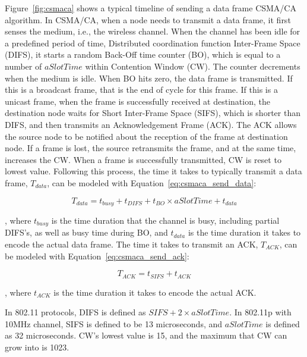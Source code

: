 \documentclass[12pt]{report}
\begin{document}
Figure~\ref{fig:csmaca} shows a typical timeline of sending a data frame CSMA/CA algorithm. In CSMA/CA, when a node needs to transmit a data frame, it first senses the medium, i.e., the wireless channel. When the channel has been idle for a predefined period of time, Distributed coordination function Inter-Frame Space (DIFS), it starts a random Back-Off time counter (BO), which is equal to a number of $aSlotTime$ within Contention Window (CW). The counter decrements when the medium is idle. When BO hits zero, the data frame is transmitted. If this is a broadcast frame, that is the end of cycle for this frame. If this is a unicast frame, when the frame is successfully received at destination, the destination node waits for Short Inter-Frame Space (SIFS), which is shorter than DIFS, and then transmits an Acknowledgement Frame (ACK). The ACK allows the source node to be notified about the reception of the frame at destination node. If a frame is lost, the source retransmits the frame, and at the same time, increases the CW. When a frame is successfully transmitted, CW is reset to lowest value. Following this process, the time it takes to typically transmit a data frame, $T_{data}$, can be modeled with Equation~\ref{eq:csmaca_send_data}:

\begin{equation}
  T_{data}=t_{busy}+t_{DIFS}+t_{BO}\times aSlotTime+t_{data}
  \label{eq:csmaca_send_data}
\end{equation}

, where $t_{busy}$ is the time duration that the channel is busy, including partial DIFS's, as well as busy time during BO, and $t_{data}$ is the time duration it takes to encode the actual data frame. The time it takes to transmit an ACK, $T_{ACK}$, can be modeled with Equation~\ref{eq:csmaca_send_ack}:

\begin{equation}
  T_{ACK}=t_{SIFS}+t_{ACK}
  \label{eq:csmaca_send_ack}
\end{equation}

, where $t_{ACK}$ is the time duration it takes to encode the actual ACK.

In 802.11 protocols, DIFS is defined as $SIFS + 2 \times aSlotTime$. In 802.11p with 10MHz channel, SIFS is defined to be 13 microseconds, and $aSlotTime$ is defined as 32 microseconds. CW's lowest value is 15, and the maximum that CW can grow into is 1023. \cite{ieee201280211macphy}
\end{document}
